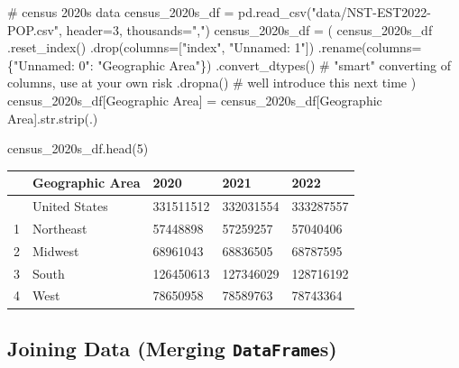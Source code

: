 \documentclass[
  letterpaper,
  DIV=11,
  numbers=noendperiod]{scrreprt}
\newenvironment{Shaded}{\begin{snugshade}}{\end{snugshade}}
\newcommand{\BuiltInTok}[1]{\textcolor[rgb]{0.00,0.23,0.31}{#1}}
\newcommand{\CommentTok}[1]{\textcolor[rgb]{0.37,0.37,0.37}{#1}}
\newcommand{\DecValTok}[1]{\textcolor[rgb]{0.68,0.00,0.00}{#1}}
\newcommand{\NormalTok}[1]{\textcolor[rgb]{0.00,0.23,0.31}{#1}}
\newcommand{\OperatorTok}[1]{\textcolor[rgb]{0.37,0.37,0.37}{#1}}
\newcommand{\StringTok}[1]{\textcolor[rgb]{0.13,0.47,0.30}{#1}}
\begin{document}
\begin{Shaded}
\begin{Highlighting}[]
\CommentTok{\# census 2020s data}
\NormalTok{census\_2020s\_df }\OperatorTok{=}\NormalTok{ pd.read\_csv(}\StringTok{"data/NST{-}EST2022{-}POP.csv"}\NormalTok{, header}\OperatorTok{=}\DecValTok{3}\NormalTok{, thousands}\OperatorTok{=}\StringTok{","}\NormalTok{)}
\NormalTok{census\_2020s\_df }\OperatorTok{=}\NormalTok{ (}
\NormalTok{    census\_2020s\_df}
\NormalTok{    .reset\_index()}
\NormalTok{    .drop(columns}\OperatorTok{=}\NormalTok{[}\StringTok{"index"}\NormalTok{, }\StringTok{"Unnamed: 1"}\NormalTok{])}
\NormalTok{    .rename(columns}\OperatorTok{=}\NormalTok{\{}\StringTok{"Unnamed: 0"}\NormalTok{: }\StringTok{"Geographic Area"}\NormalTok{\})}
\NormalTok{    .convert\_dtypes()                 }\CommentTok{\# "smart" converting of columns, use at your own risk}
\NormalTok{    .dropna()                         }\CommentTok{\# we\textquotesingle{}ll introduce this next time}
\NormalTok{)}
\NormalTok{census\_2020s\_df[}\StringTok{\textquotesingle{}Geographic Area\textquotesingle{}}\NormalTok{] }\OperatorTok{=}\NormalTok{ census\_2020s\_df[}\StringTok{\textquotesingle{}Geographic Area\textquotesingle{}}\NormalTok{].}\BuiltInTok{str}\NormalTok{.strip(}\StringTok{\textquotesingle{}.\textquotesingle{}}\NormalTok{)}

\NormalTok{census\_2020s\_df.head(}\DecValTok{5}\NormalTok{)}
\end{Highlighting}
\end{Shaded}

\begin{longtable}[]{@{}lllll@{}}
\toprule\noalign{}
& Geographic Area & 2020 & 2021 & 2022 \\
\midrule\noalign{}
\endhead
\bottomrule\noalign{}
\endlastfoot
0 & United States & 331511512 & 332031554 & 333287557 \\
1 & Northeast & 57448898 & 57259257 & 57040406 \\
2 & Midwest & 68961043 & 68836505 & 68787595 \\
3 & South & 126450613 & 127346029 & 128716192 \\
4 & West & 78650958 & 78589763 & 78743364 \\
\end{longtable}

\subsection{\texorpdfstring{Joining Data (Merging
\texttt{DataFrame}s)}{Joining Data (Merging DataFrames)}}\label{joining-data-merging-dataframes}
\end{document}
